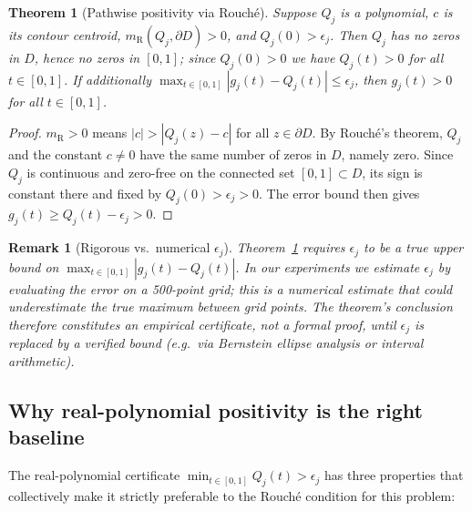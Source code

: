 \documentclass{article}
\newtheorem{theorem}{Theorem}
\newtheorem{remark}{Remark}
\theoremstyle{definition}
\newcommand{\abs}[1]{\left|#1\right|}
\begin{document}
\begin{theorem}[Pathwise positivity via Rouch\'e]
  \label{thm:main}
  Suppose $Q_j$ is a polynomial, $c$ is its contour centroid,
  $m_{\mathrm{R}}(Q_j,\partial D)>0$, and $Q_j(0)>\epsilon_j$.  Then
  $Q_j$ has no zeros in $D$, hence no zeros in $[0,1]$; since $Q_j(0)>0$
  we have $Q_j(t)>0$ for all $t\in[0,1]$.  If additionally
  $\max_{t\in[0,1]}\abs{g_j(t)-Q_j(t)}\leq\epsilon_j$, then
  $g_j(t)>0$ for all $t\in[0,1]$.
\end{theorem}

\begin{proof}
  $m_{\mathrm{R}}>0$ means $\abs{c}>\abs{Q_j(z)-c}$ for all $z\in\partial D$.
  By Rouch\'e's theorem, $Q_j$ and the constant $c\neq 0$ have the same
  number of zeros in $D$, namely zero.  Since $Q_j$ is continuous and zero-free
  on the connected set $[0,1]\subset D$, its sign is constant there and fixed
  by $Q_j(0)>\epsilon_j>0$.  The error bound then gives
  $g_j(t)\geq Q_j(t)-\epsilon_j>0$.
\end{proof}

\begin{remark}[Rigorous vs.\ numerical $\epsilon_j$]
  \label{rem:epsilon}
  Theorem~\ref{thm:main} requires $\epsilon_j$ to be a \emph{true} upper bound
  on $\max_{t\in[0,1]}\abs{g_j(t)-Q_j(t)}$.  In our experiments we estimate
  $\epsilon_j$ by evaluating the error on a 500-point grid; this is a numerical
  estimate that could underestimate the true maximum between grid points.  The
  theorem's conclusion therefore constitutes an \emph{empirical} certificate,
  not a formal proof, until $\epsilon_j$ is replaced by a verified bound (e.g.\
  via Bernstein ellipse analysis or interval arithmetic).
\end{remark}

\subsection{Why real-polynomial positivity is the right baseline}
\label{sec:real_baseline}

The real-polynomial certificate $\min_{t\in[0,1]} Q_j(t) > \epsilon_j$ has
three properties that collectively make it strictly preferable to the
Rouch\'e condition for this problem:
\end{document}

